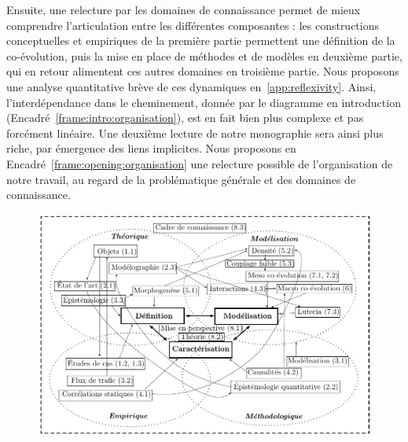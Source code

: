 Ensuite, une relecture par les domaines de connaissance permet de mieux comprendre l'articulation entre les différentes composantes : les constructions conceptuelles et empiriques de la première partie permettent une définition de la co-évolution, puis la mise en place de méthodes et de modèles en deuxième partie, qui en retour alimentent ces autres domaines en troisième partie. Nous proposons une analyse quantitative brève de ces dynamiques en~\ref{app:reflexivity}. Ainsi, l'interdépendance dans le cheminement, donnée par le diagramme en introduction (Encadré~\ref{frame:intro:organisation}), est en fait bien plus complexe et pas forcément linéaire. Une deuxième lecture de notre monographie sera ainsi plus riche, par émergence des liens implicites. Nous proposons en Encadré~\ref{frame:opening:organisation} une relecture possible de l'organisation de notre travail, au regard de la problématique générale et des domaines de connaissance.



\begin{figure}
	\begin{mdframed}
	\includegraphics[width=\linewidth]{Figures/Theory/orga.pdf}
	\medskip
	\end{mdframed}
\end{figure}




